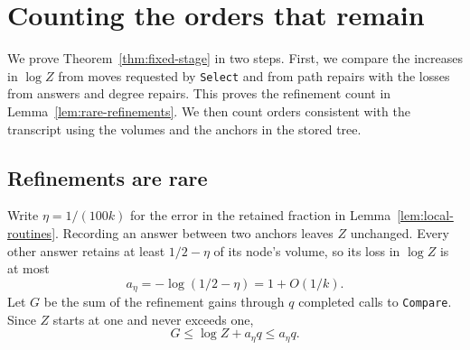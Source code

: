 \section{Counting the orders that remain}\label{sec:potential}

We prove Theorem~\ref{thm:fixed-stage} in two steps. First, we compare
the increases in $\log Z$ from moves requested by \texttt{Select} and from
path repairs with the losses from answers and degree repairs. This proves
the refinement count in Lemma~\ref{lem:rare-refinements}. We then count
orders consistent with the transcript using the volumes and the anchors
in the stored tree.

\subsection{Refinements are rare}\label{sec:rare-refinements}\label{sec:guarantees}

Write $\eta=1/(100k)$ for the error in the retained fraction in
Lemma~\ref{lem:local-routines}. Recording an answer between two anchors
leaves $Z$ unchanged.
Every other answer retains at least $1/2-\eta$ of its node's volume, so
its loss in $\log Z$ is at most
\begin{equation}\label{eq:comparison-loss}
a_\eta=-\log(1/2-\eta)=1+O(1/k).
\end{equation}
Let $G$ be the sum of the refinement gains through $q$ completed calls
to \texttt{Compare}.
Since $Z$ starts at one and never exceeds one,
\begin{equation}\label{eq:total-refinement-gain}
G\le\log Z+a_\eta q\le a_\eta q.
\end{equation}

